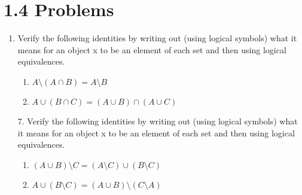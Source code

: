 \documentclass{scrartcl}
\begin{document}
    \section*{1.4 Problems}

    \begin{enumerate}[start=5]
        \item Verify the following identities by writing out (using logical symbols) what it means for an object x to be an element of each set and then using logical equivalences.
            \begin{enumerate}
                \item $A \setminus (A \cap B) = A \setminus B$
                \item $A \cup (B \cap C) = (A \cup B) \cap (A \cup C)$
            \end{enumerate}

        \item[7.] Verify the following identities by writing out (using logical symbols) what it means for an object x to be an element of each set and then using logical equivalences.
            \begin{enumerate}
                \item $(A \cup B) \setminus C = (A \setminus C) \cup (B \setminus C)$
                \item $A \cup (B \setminus C) = (A \cup B) \setminus (C \setminus A)$
            \end{enumerate}
    

\end{enumerate}
\end{document}
